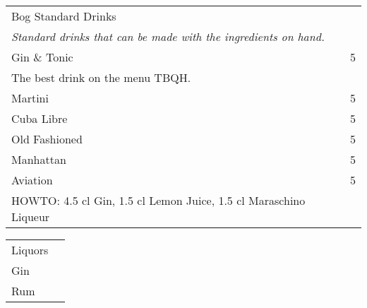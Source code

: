 \documentclass[12pt]{article}
\makeatletter
\newcommand*\ColText[1]{\textcolor{Goldenrod3}{#1}}
\newenvironment{Group}[1]
  {\noindent\begin{tabular*}{\textwidth}{@{}p{.8\linewidth}@{\extracolsep{\fill}}r@{}}
    {\fontsize{24}{29}\selectfont\ColText{#1}}\\[0.8em]}
  {\end{tabular*}}
\newcommand*\Entry[2]{%
  \sffamily#1 & #2}
\newcommand*\HowToMake[1]{
  HOWTO: \hspace*{1em}\footnotesize #1
}
\makeatother
\begin{document}
\vfill

\begin{Group}{Bog Standard Drinks}
\emph{Standard drinks that can be made with the ingredients on hand.} \\
\Entry{Gin \& Tonic}{5} \\
\Entry{The best drink on the menu TBQH.} \\
\Entry{Martini}{5} \\
\Entry{Cuba Libre}{5} \\
\Entry{Old Fashioned}{5} \\
\Entry{Manhattan}{5} \\
\Entry{Aviation}{5} \\
\HowToMake{4.5 cl Gin, 1.5 cl Lemon Juice, 1.5 cl Maraschino Liqueur} \\
\end{Group}

\vfill

\begin{Group}{Liquors}
\Entry{Gin}{} \\
\Entry{Rum}{} \\
\end{Group}
\end{document}
